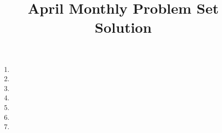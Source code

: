 \documentclass[12pt]{article}
\title{April Monthly Problem Set Solution}
\author{\vspace{-24pt}}
\date{\vspace{-24pt}}
\begin{document}
 \maketitle \pagestyle{empty}

\begin{enumerate}

\item %


\item %


\item %


\item %


\item %


\item %


\item %


\end{enumerate}
\end{document}
